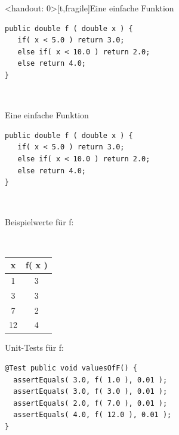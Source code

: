 \begin{frame}<handout: 0>[t,fragile]{Eine einfache Funktion} %
\begin{lstlisting}
public double f ( double x ) {
   if( x < 5.0 ) return 3.0;
   else if( x < 10.0 ) return 2.0;
   else return 4.0;
}
\end{lstlisting}
~ \\[-.5em]
\begin{minipage}[t]{3.5cm}
\end{minipage} 
\hfill

\end{frame}

\begin{frame}[t,fragile]{Eine einfache Funktion} %
\begin{lstlisting}
public double f ( double x ) {
   if( x < 5.0 ) return 3.0;
   else if( x < 10.0 ) return 2.0;
   else return 4.0;
}
\end{lstlisting}
~ \\[-.5em]
\begin{minipage}[t]{3.5cm}
Beispielwerte für f:

~ \\
\begin{tabular}{|c|c|}
\textbf{x} & \textbf{f( x )}  \\ \hline
1 & 3  \\
3 & 3  \\
7 & 2  \\
12 & 4
\end{tabular} 
\end{minipage} 
\hfill
\begin{minipage}[t]{7cm}
Unit-Tests für f:

\begin{lstlisting}
@Test public void valuesOfF() {
  assertEquals( 3.0, f( 1.0 ), 0.01 );
  assertEquals( 3.0, f( 3.0 ), 0.01 );
  assertEquals( 2.0, f( 7.0 ), 0.01 );
  assertEquals( 4.0, f( 12.0 ), 0.01 );
}
\end{lstlisting}
\end{minipage}

\end{frame}

